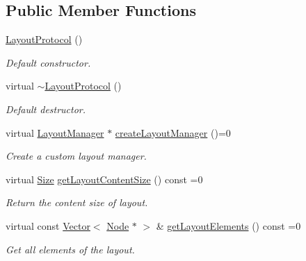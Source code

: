 \subsection*{Public Member Functions}
\begin{DoxyCompactItemize}
\item 
\mbox{\label{classui_1_1LayoutProtocol_a69e970e2118a39198d4b4e7a268789ca}} 
\hyperlink{classui_1_1LayoutProtocol_a69e970e2118a39198d4b4e7a268789ca}{Layout\+Protocol} ()
\begin{DoxyCompactList}\small\item\em Default constructor. \end{DoxyCompactList}\item 
\mbox{\label{classui_1_1LayoutProtocol_afed555eae002aaf1b751b5e4ee945f68}} 
virtual \hyperlink{classui_1_1LayoutProtocol_afed555eae002aaf1b751b5e4ee945f68}{$\sim$\+Layout\+Protocol} ()
\begin{DoxyCompactList}\small\item\em Default destructor. \end{DoxyCompactList}\item 
virtual \hyperlink{classui_1_1LayoutManager}{Layout\+Manager} $\ast$ \hyperlink{classui_1_1LayoutProtocol_a4ff58063d53e9e9b9684a1e2e6cc485a}{create\+Layout\+Manager} ()=0
\begin{DoxyCompactList}\small\item\em Create a custom layout manager. \end{DoxyCompactList}\item 
virtual \hyperlink{classSize}{Size} \hyperlink{classui_1_1LayoutProtocol_afacf70c8ceec076a9c1237427cbd614a}{get\+Layout\+Content\+Size} () const =0
\begin{DoxyCompactList}\small\item\em Return the content size of layout. \end{DoxyCompactList}\item 
virtual const \hyperlink{classVector}{Vector}$<$ \hyperlink{classNode}{Node} $\ast$ $>$ \& \hyperlink{classui_1_1LayoutProtocol_acd689e1718c903c7e9ed3277eb83b97c}{get\+Layout\+Elements} () const =0
\begin{DoxyCompactList}\small\item\em Get all elements of the layout. \end{DoxyCompactList}\item 
\mbox{\label{classui_1_1LayoutProtocol_ae6b08f2d2ce43c7b55200fb100a5a6d1}} 

\end{DoxyCompactItemize}
